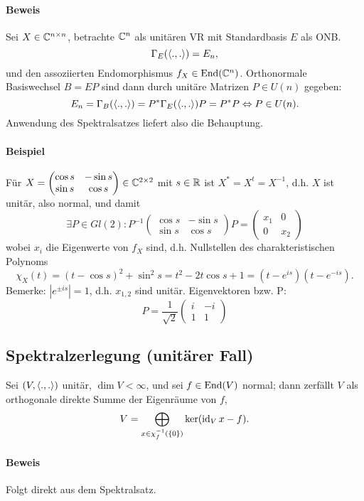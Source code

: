 \paragraph{Beweis}
	Sei $ X\in \mathbb{C}^{n\times n} $, betrachte $ \mathbb{C}^n $ als unitären VR mit Standardbasis $ E $ als ONB.
		\[ \Gamma_E(\langle .,. \rangle) = E_n, \]
	und den assoziierten Endomorphismus $ f_X\in \operatorname{End}(\mathbb{C}^n) $. Orthonormale Basiswechsel $ B=EP $ sind dann durch unitäre Matrizen $ P\in U(n) $ gegeben:
		\[ E_n = \Gamma_B(\langle .,. \rangle) = P^*\Gamma_E(\langle .,. \rangle)P = P^*P \Leftrightarrow P\in U(n). \]
	Anwendung des Spektralsatzes liefert also die Behauptung.

\paragraph{Beispiel}
	Für  $ X = \begin{pmatrix}
	\cos s & -\sin s\\ \sin s & \cos s
	\end{pmatrix}\in \mathbb{C}^{2\times 2} $ mit $ s\in \mathbb{R} $ ist $ X^*=X^t = X^{-1} $, d.h. $ X $ ist unitär, also normal, und damit
		\[ \exists P\in Gl(2): P^{-1}\begin{pmatrix}
		\cos s & -\sin s\\ \sin s & \cos s
		\end{pmatrix}P = \begin{pmatrix}
		x_1 & 0 \\ 0 & x_2
		\end{pmatrix} \]
	wobei $ x_i $ die Eigenwerte von $ f_X $ sind, d.h. Nullstellen des charakteristischen Polynoms
		\[ \chi_X(t) = (t-\cos s)^2 + \sin^2 s = t^2-2t\cos s + 1 = (t-e^{is})(t-e^{-is}). \]
	Bemerke: $ |e^{\pm is}| = 1 $, d.h. $ x_{1,2} $ sind unitär. Eigenvektoren bzw. P:
		\[ P = \frac{1}{\sqrt{2}}\begin{pmatrix} i & -i \\ 1 & 1 \end{pmatrix} \]

\subsection{Spektralzerlegung (unitärer Fall)}
\begin{Lemma}[]
	Sei $ (V,\langle .,. \rangle) $ unitär, $ \dim V <\infty $, und sei $ f\in \operatorname{End}(V) $ normal; dann zerfällt $ V $ als orthogonale direkte Summe der Eigenräume von $ f $,
		\[ V = \bigoplus_{x\in \chi_f^{-1}(\{0\})} \ker(\operatorname{id}_Vx-f). \]
\end{Lemma}
\paragraph{Beweis}
	Folgt direkt aus dem Spektralsatz.
